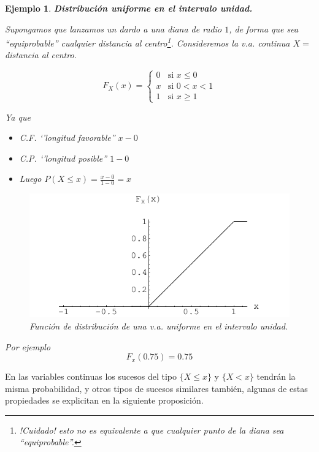 \documentclass[12pt]{report}
\newtheorem{example}[definition]{Ejemplo}
\begin{document}
    \begin{example}
    \textbf{Distribución uniforme en el intervalo unidad.}

    Supongamos que lanzamos un dardo a una diana de radio $1$, de forma que sea
    ``\textit{equiprobable}'' cualquier distancia al centro\footnote{!Cuidado! esto no es equivalente
    a que cualquier punto de la diana  sea ``\textit{equiprobable}''.}.
    Consideremos la v.a. continua $X=$distancia al centro.

    $$F_{X}(x)=\left\{\begin{array}{ll}
    0 & \mbox{si } x\leq 0\\
    x & \mbox{si } 0<x<1\\
    1 & \mbox{si } x\geq 1
\end{array}\right.$$


Ya que
\begin{itemize}
\item C.F. `'\textit{longitud favorable}'' $x-0$
\item C.P. `'\textit{longitud posible}'' $1-0$
\item Luego $P(X\leq x)=\frac{x-0}{1-0}=x$
\end{itemize}


\begin{figure}
\begin{center}
\includegraphics{distribucionuniforme}
\end{center}
\caption{Función de distribución de una v.a. uniforme en el intervalo unidad.}
\end{figure}

Por ejemplo $$F_{x}(0.75)=0.75$$
\end{example}



En las variables continuas los sucesos del tipo $\{X\leq x \}$ y $\{X< x \}$ tendrán la
misma probabilidad, y otros tipos de sucesos similares también, algunas de estas
propiedades se explicitan en la siguiente proposición.
\end{document}
